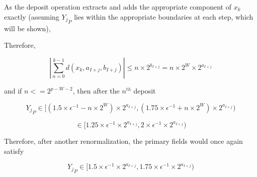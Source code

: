 \documentclass[12pt]{article}
\theoremstyle{plain}
\begin{document}
    As the deposit operation extracts and adds the appropriate component of $x_k$ exactly (assuming ${Y_j}_P$ lies within the appropriate boundaries at each step, which will be shown),

    Therefore,

    \begin{equation*}
    |\sum \limits_{n = 0}^{k - 1} d(x_k, a_{I + j}, b_{I + j})| \leq n \times 2^{b_{I + j}} = n \times 2^{W} \times 2^{a_{I + j}}
    \end{equation*}

    and if $n <= 2^{p - W - 2}$, then after the $n^{th}$ deposit

    \begin{equation*}
    {Y_j}_P \in [(1.5 \times \epsilon^{-1} - n \times 2^W)\times 2^{a_{I + j}}, (1.75 \times \epsilon^{-1} + n \times 2^W)\times 2^{a_{I + j}})
    \end{equation*}

    \begin{equation*}
    \in [1.25 \times \epsilon^{-1}\times 2^{a_{I + j}}, 2 \times \epsilon^{-1}\times 2^{a_{I + j}})
    \end{equation*}

    Therefore, after another renormalization, the primary fields would once again satisfy

    \begin{equation*}
    {Y_j}_P \in [1.5 \times \epsilon^{-1}\times 2^{a_{I + j}}, 1.75 \times \epsilon^{-1}\times 2^{a_{I + j}})
    \end{equation*}
\end{document}
